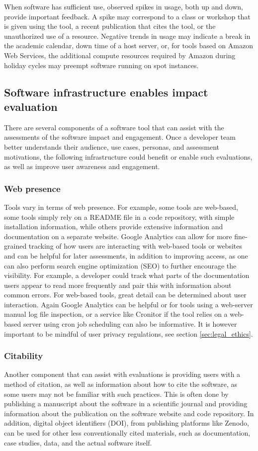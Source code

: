 \documentclass{article}
\begin{document}
When software has sufficient use, observed spikes in usage, both up and down, provide important feedback. A spike may correspond to a class or workshop that is given using the tool, a recent publication that cites the tool, or the unauthorized use of a resource. Negative trends in usage may indicate a break in the academic calendar, down time of a host server, or, for tools based on Amazon Web Services, the additional compute resources required by Amazon during holiday cycles may preempt software running on spot instances.


\subsection{Software infrastructure enables impact evaluation}
There are several components of a software tool that can assist with the assessments of the software impact and engagement. Once a developer team better understands their audience, use cases, personas, and assessment motivations, the following infrastructure could benefit or enable such evaluations, as well as improve user awareness and engagement. 

\subsubsection{Web presence}
Tools vary in terms of web presence. For example, some tools are web-based, some tools simply rely on a README file in a code repository, with simple installation information, while others provide extensive information and documentation on a separate website. Google Analytics can allow for more fine-grained tracking of how users are interacting with web-based tools or websites and can be helpful for later assessments, in addition to improving access, as one can also perform search engine optimization (SEO) to further encourage the visibility. For example, a developer could track what parts of the documentation users appear to read more frequently and pair this with information about common errors. For web-based tools, great detail can be determined about user interaction. Again Google Analytics can be helpful or for tools using a web-server manual log file inspection, or a service like Cronitor \cite{cronitor}  if the tool relies on a web-based server using cron \cite{cron_2009} job scheduling can also be informative.  It is however important to be mindful of user privacy regulations, see section \ref{sec:legal_ethics}.

\subsubsection{Citability}
Another component that can assist with evaluations is providing users with a method of citation, as well as information about how to cite the software, as some users may not be familiar with such practices. This is often done by publishing a manuscript about the software in a scientific journal and providing information about the publication on the software website and code repository. In addition, digital object identifiers (DOI), from publishing platforms like Zenodo, can be used for other less conventionally cited materials, such as documentation, case studies, data, and the actual software itself.
\end{document}
